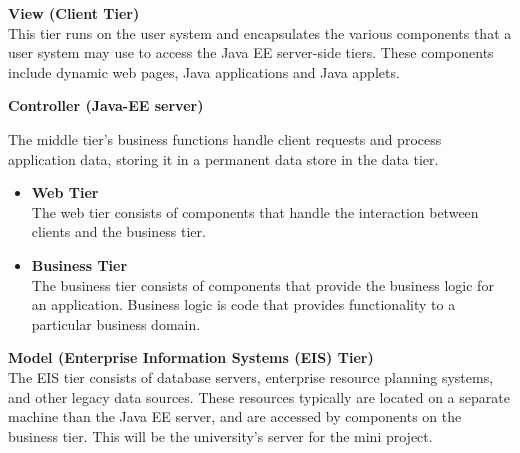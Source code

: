 \begin{flushleft}
\textbf{View (Client Tier)}\\
This tier runs on the user system and encapsulates the various components that a user system may use to access the Java EE server-side tiers. These components include dynamic web pages, Java applications and Java applets.

\textbf{Controller (Java-EE server)}

The middle tier's business functions handle client requests and process application data, storing it in a permanent data store in the data tier.

\begin{itemize}
	\item \textbf{Web Tier}
	\\The web tier consists of components that handle the interaction between clients and the business tier.
	
	\item \textbf{Business Tier}
	\\The business tier consists of components that provide the business logic for an application. Business logic is code that provides functionality to a particular business domain.
\end{itemize}

\textbf{Model (Enterprise Information Systems (EIS) Tier)}\\
The EIS tier consists of database servers, enterprise resource planning systems, and other legacy data sources. These resources typically are located on a separate machine than the Java EE server, and are accessed by components on the business tier. This will be the university's server for the mini project.

\end{flushleft}






